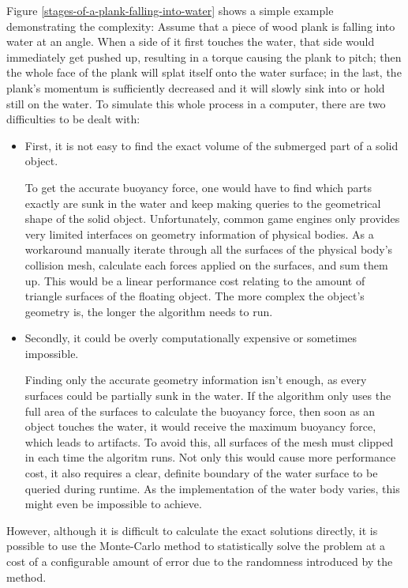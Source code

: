 Figure \ref{stages-of-a-plank-falling-into-water} shows a simple example demonstrating the complexity:
Assume that a piece of wood plank is falling into water at an angle.
When a side of it first touches the water, that side would immediately get pushed up, resulting in a torque causing the plank to pitch;
then the whole face of the plank will splat itself onto the water surface;
in the last, the plank's momentum is sufficiently decreased and it will slowly sink into or hold still on the water.
To simulate this whole process in a computer, there are two difficulties to be dealt with:

\begin{itemize}
	\item First, it is not easy to find the exact volume of the submerged part of a solid object.

		To get the accurate buoyancy force, one would have to find which parts exactly are sunk in the water and keep making queries to the geometrical shape of the solid object.
		Unfortunately, common game engines only provides very limited interfaces on geometry information of physical bodies.
		As a workaround manually iterate through all the surfaces of the physical body's collision mesh, calculate each forces applied on the surfaces, and sum them up.
		This would be a linear performance cost relating to the amount of triangle surfaces of the floating object.
		The more complex the object's geometry is, the longer the algorithm needs to run.

	\item Secondly, it could be overly computationally expensive or sometimes impossible.

		Finding only the accurate geometry information isn't enough, as every surfaces could be partially sunk in the water.
		If the algorithm only uses the full area of the surfaces to calculate the buoyancy force, then soon as an object touches the water, it would receive the maximum buoyancy force, which leads to artifacts.
		To avoid this, all surfaces of the mesh must clipped in each time the algoritm runs.
		Not only this would cause more performance cost, it also requires a clear, definite boundary of the water surface to be queried during runtime.
		As the implementation of the water body varies, this might even be impossible to achieve.
\end{itemize}

However, although it is difficult to calculate the exact solutions directly, it is possible to use the Monte-Carlo method to statistically solve the problem at a cost of a configurable amount of error due to the randomness introduced by the method.